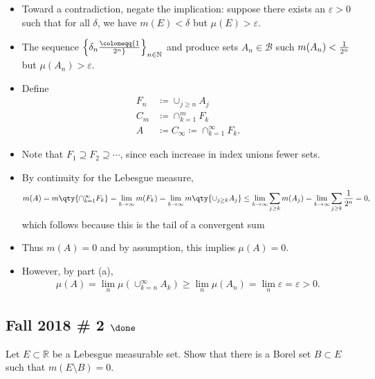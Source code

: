 \begin{solution}
\begin{itemize}
\item
  Toward a contradiction, negate the implication: suppose there exists
  an \(\varepsilon>0\) such that for all \(\delta\), we have
  \(m(E) < \delta\) but \(\mu(E) > \varepsilon\).
\item
  The sequence
  \(\left\{{\delta_n \coloneqq{1\over 2^n}}\right\}_{n\in {\mathbb{N}}}\)
  and produce sets \(A_n\in {\mathcal{B}}\) such
  \(m(A_n) < {1\over 2^n}\) but \(\mu(A_n) > \varepsilon\).
\item
  Define
  \begin{align*}
  F_n &\coloneqq\cup_{j\geq n} A_j \\
  C_m &\coloneqq\cap_{k=1}^m F_k \\
  A &\coloneqq C_\infty \coloneqq\cap_{k=1}^\infty F_k 
  .\end{align*}
\item
  Note that \(F_1 \supseteq F_2 \supseteq \cdots\), since each increase
  in index unions fewer sets.
\item
  By continuity for the Lebesgue measure,
  \begin{align*}
  m(A) 
  = m \qty{\cap_{k=1}^\infty F_k }
  = \lim_{k\to \infty} m (F_k) 
  = \lim_{k\to\infty} m\qty{\cup_{j\geq k} A_j } 
  \leq \lim_{k\to\infty} \sum_{j\geq k} m(A_j) 
  = \lim_{k\to\infty} \sum_{j\geq k} {1\over 2^n} 
  = 0
  ,\end{align*}
  which follows because this is the tail of a convergent sum
\item
  Thus \(m(A) = 0\) and by assumption, this implies \(\mu(A) = 0\).
\item
  However, by part (a),
  \begin{align*}
  \mu(A) = \lim_n \mu\left( \cup_{k=n}^\infty A_k \right)
  \geq \lim_n \mu(A_n) = \lim_n \varepsilon = \varepsilon > 0
  .\end{align*}
\end{itemize}

\end{solution}


\hypertarget{fall-2018-2-done}{%
\subsection{\texorpdfstring{Fall 2018 \# 2
\(\done\)}{Fall 2018 \# 2 \textbackslash done}}\label{fall-2018-2-done}}

Let \(E\subset {\mathbb{R}}\) be a Lebesgue measurable set. Show that
there is a Borel set \(B \subset E\) such that \(m(E\setminus B) = 0\).

